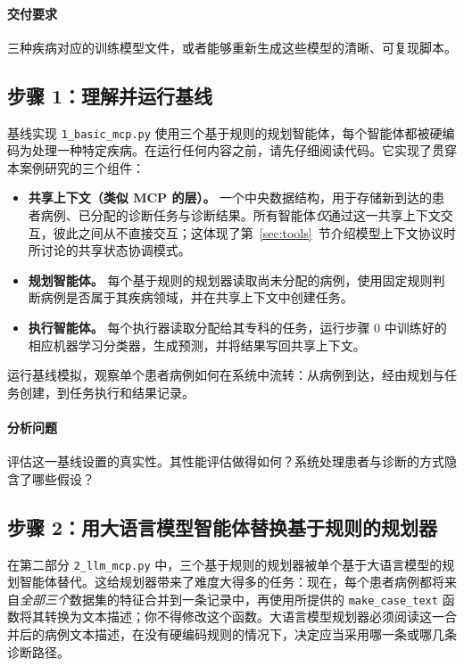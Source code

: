 \paragraph{交付要求} 三种疾病对应的训练模型文件，或者能够重新生成这些模型的清晰、可复现脚本。


\subsection{步骤 1：理解并运行基线}

基线实现 \texttt{1\_basic\_mcp.py} 使用三个基于规则的规划智能体，每个智能体都被硬编码为处理一种特定疾病。在运行任何内容之前，请先仔细阅读代码。它实现了贯穿本案例研究的三个组件：

\begin{itemize}
    \item \textbf{共享上下文（类似 MCP 的层）。} 一个中央数据结构，用于存储新到达的患者病例、已分配的诊断任务与诊断结果。所有智能体\emph{仅}通过这一共享上下文交互，彼此之间从不直接交互；这体现了第~\ref{sec:tools}~节介绍模型上下文协议时所讨论的共享状态协调模式。
    \item \textbf{规划智能体。} 每个基于规则的规划器读取尚未分配的病例，使用固定规则判断病例是否属于其疾病领域，并在共享上下文中创建任务。
    \item \textbf{执行智能体。} 每个执行器读取分配给其专科的任务，运行步骤 0 中训练好的相应机器学习分类器，生成预测，并将结果写回共享上下文。
\end{itemize}

运行基线模拟，观察单个患者病例如何在系统中流转：从病例到达，经由规划与任务创建，到任务执行和结果记录。

\paragraph{分析问题} 评估这一基线设置的真实性。其性能评估做得如何？系统处理患者与诊断的方式隐含了哪些假设？



\subsection[步骤 2：替换基于规则的规划器]{步骤 2：用大语言模型智能体替换基于规则的规划器}

在第二部分 \texttt{2\_llm\_mcp.py} 中，三个基于规则的规划器被单个基于大语言模型的规划智能体替代。这给规划器带来了难度大得多的任务：现在，每个患者病例都将来自\emph{全部三个}数据集的特征合并到一条记录中，再使用所提供的 \texttt{make\_case\_text} 函数将其转换为文本描述；你不得修改这个函数。大语言模型规划器必须阅读这一合并后的病例文本描述，在没有硬编码规则的情况下，决定应当采用哪一条或哪几条诊断路径。

